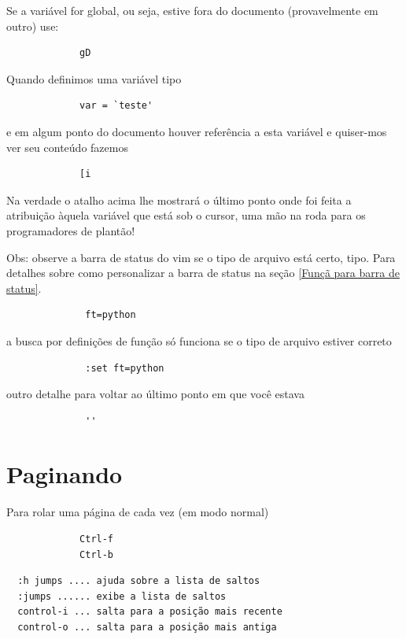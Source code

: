 \documentclass[10pt,a4paper,openany]{book}
\begin{document}
Se a variável for global, ou seja, estive fora do documento
(provavelmente em outro) use:

\begin{verbatim}
			 gD
\end{verbatim}

Quando definimos uma variável tipo

\begin{verbatim}
			 var = `teste'
\end{verbatim}

e em algum ponto do documento houver referência a esta variável e
quiser-mos ver seu conteúdo fazemos

\begin{verbatim}
			 [i
\end{verbatim}
Na verdade o atalho acima lhe mostrará o último ponto onde foi feita
a atribuição àquela variável que está sob o cursor, uma mão na roda
para os programadores de plantão!

Obs: observe a  barra de status do vim se o tipo de arquivo está certo,
tipo. Para detalhes sobre como personalizar a barra de status na seção
\ref{Funçã para barra de status}.

\begin{verbatim}
			  ft=python
\end{verbatim}

a busca por definições de função só funciona se o tipo de arquivo
estiver correto

\begin{verbatim}
			  :set ft=python
\end{verbatim}

outro detalhe para voltar ao último ponto em que você estava

\begin{verbatim}
			  ''
\end{verbatim}

\section{Paginando}
\label{Paginando}

Para rolar uma página de cada vez (em modo normal)

\begin{verbatim}
			 Ctrl-f
			 Ctrl-b
\end{verbatim}


\begin{verbatim}
  :h jumps .... ajuda sobre a lista de saltos
  :jumps ...... exibe a lista de saltos
  control-i ... salta para a posição mais recente
  control-o ... salta para a posição mais antiga
\end{verbatim}
\end{document}
